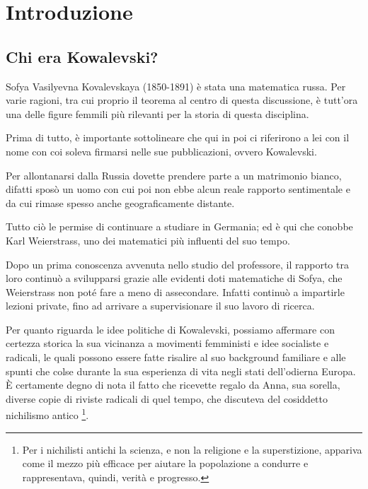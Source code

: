 \chapter{Introduzione}

\section{Chi era Kowalevski?}

Sofya Vasilyevna Kovalevskaya (1850-1891) è stata una matematica russa. Per varie ragioni, tra cui proprio il teorema al centro di questa discussione, è tutt’ora una delle figure femmili più rilevanti per la storia di questa disciplina.

Prima di tutto, è importante sottolineare che qui in poi ci riferirono a lei con il nome con coi soleva firmarsi nelle sue pubblicazioni, ovvero Kowalevski.

Per allontanarsi dalla Russia dovette prendere parte a un matrimonio bianco, difatti sposò un uomo con cui poi non ebbe alcun reale rapporto sentimentale e da cui rimase spesso anche geograficamente distante.

Tutto ciò le permise di continuare a studiare in Germania; ed è qui che conobbe Karl Weierstrass, uno dei matematici più influenti del suo tempo.

Dopo un prima conoscenza avvenuta nello studio del professore, il rapporto tra loro continuò a svilupparsi grazie alle evidenti doti matematiche di Sofya, che Weierstrass non poté fare a meno di assecondare. Infatti continuò a impartirle lezioni private, fino ad arrivare a supervisionare il suo lavoro di ricerca.

Per quanto riguarda le idee politiche di Kowalevski, possiamo affermare con certezza storica la sua vicinanza a movimenti femministi e idee socialiste e radicali, le quali possono essere fatte risalire al suo background familiare e alle spunti che colse durante la sua esperienza di vita negli stati dell'odierna Europa. È certamente degno di nota il fatto che ricevette regalo da Anna, sua sorella, diverse copie di riviste radicali di quel tempo, che discuteva del cosiddetto nichilismo antico
\footnote{Per i nichilisti antichi la scienza, e non la religione e la superstizione, appariva come il mezzo più efficace per aiutare la popolazione a condurre e rappresentava, quindi, verità e progresso.}.

